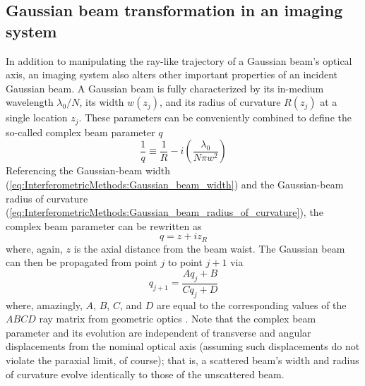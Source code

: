 \subsection{Gaussian beam transformation in an imaging system}
\label{sec:InterferometricMethods:imaging:Gaussian_beam_transformation}
In addition to manipulating the ray-like trajectory
of a Gaussian beam's optical axis,
an imaging system also alters
other important properties of an incident Gaussian beam.
A Gaussian beam is fully characterized by
its in-medium wavelength $\lambda_0 / N$,
its width $w(z_j)$, and
its radius of curvature $R(z_j)$
at a single location $z_j$.
These parameters can be conveniently combined
to define the so-called complex beam parameter $q$
\cite[Sec.~17.1]{siegman_lasers}
\begin{equation}
  \frac{1}{q}
  \equiv
  \frac{1}{R}
  -
  i \left( \frac{\lambda_0}{N \pi w^2} \right)
  \label{eq:InterferometricMethods:complex_beam_parameter_inverse}
\end{equation}
Referencing the Gaussian-beam width
(\ref{eq:InterferometricMethods:Gaussian_beam_width}) and
the Gaussian-beam radius of curvature
(\ref{eq:InterferometricMethods:Gaussian_beam_radius_of_curvature}),
the complex beam parameter can be rewritten as
\begin{equation}
  q = z + i z_R
  \label{eq:InterferometricMethods:complex_beam_parameter}
\end{equation}
where, again, $z$ is the axial distance from the beam waist.
The Gaussian beam can then be propagated from point $j$ to point $j + 1$ via
\begin{equation}
  q_{j+1}
  =
  \frac{A q_j + B}{C q_j + D}
  \label{eq:InterferometricMethods:complex_beam_parameter_propagation}
\end{equation}
where, amazingly, $A$, $B$, $C$, and $D$
are equal to the corresponding values
of the $ABCD$ ray matrix from geometric optics
\cite[Sec.~20.2]{siegman_lasers} \cite{tovar_generalized_beam_matrices_IV}.
Note that the complex beam parameter and its evolution
are independent of transverse and angular displacements
from the nominal optical axis
(assuming such displacements do not violate the paraxial limit, of course);
that is, a scattered beam's width and radius of curvature
evolve identically to those of the unscattered beam.

